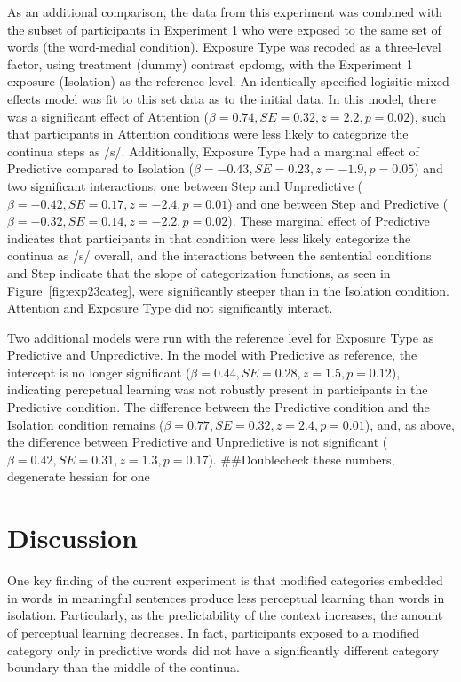 As an additional comparison, the data from this experiment was combined with the subset of participants in Experiment 1 who were exposed to the same set of words (the word-medial condition).  
Exposure Type was recoded as a three-level factor, using treatment (dummy) contrast cpdomg, with the Experiment 1 exposure (Isolation) as the reference level. 
An identically specified logisitic mixed effects model was fit to this set data as to the initial data.  
In this model, there was a significant effect of Attention ($\beta = 0.74, SE = 0.32, z = 2.2, p = 0.02$), such that participants in Attention conditions were less likely to categorize the continua steps as /s/.  
Additionally, Exposure Type had a marginal effect of Predictive compared to Isolation ($\beta = -0.43, SE = 0.23, z = -1.9, p = 0.05$) and two significant interactions, one between Step and Unpredictive ($\beta = -0.42, SE = 0.17, z = -2.4, p = 0.01$) and one between Step and Predictive ($\beta = -0.32, SE = 0.14, z = -2.2, p = 0.02$).  
These marginal effect of Predictive indicates that participants in that condition were less likely categorize the continua as /s/ overall, and the interactions between the sentential conditions and Step indicate that the slope of categorization functions, as seen in Figure~\ref{fig:exp23categ}, were significantly steeper than in the Isolation condition.
Attention and Exposure Type did not significantly interact.

Two additional models were run with the reference level for Exposure Type as Predictive and Unpredictive.  In the model with Predictive as reference, the intercept is no longer significant ($\beta = 0.44, SE = 0.28, z = 1.5, p = 0.12$), indicating percpetual learning was not robustly present in participants in the Predictive condition.  The difference between the Predictive condition and the Isolation condition remains ($\beta = 0.77, SE = 0.32, z = 2.4, p = 0.01$), and, as above, the difference between Predictive and Unpredictive is not significant ($\beta = 0.42, SE = 0.31, z = 1.3, p = 0.17$). ##Doublecheck these numbers, degenerate hessian for one


\section{Discussion}

One key finding of the current experiment is that modified categories embedded in words in meaningful sentences produce less perceptual learning than words in isolation.  Particularly, as the predictability of the context increases, the amount of perceptual learning decreases.  In fact, participants exposed to a modified category only in predictive words did not have a significantly different category boundary than the middle of the continua. 

